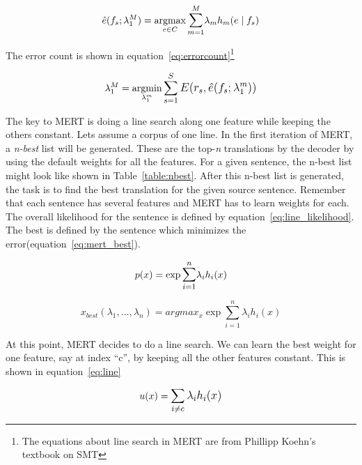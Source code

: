 \begin{equation} \label{eq:maximization_mert}
	\hat{e}(f_{s};\lambda_{1}^M) = \argmax_{e \in C} \mathlarger\sum\limits_{m=1}^{M} \lambda_{m}h_{m}(e \mid f_{s})
\end{equation}



The error count is shown in equation~\eqref{eq:errorcount}\footnote{The equations about line search in MERT are from Phillipp Koehn's textbook on SMT}

\begin{equation} \label{eq:errorcount}
	\lambda_{1}^{M} = \argmin_{\lambda_{1}^{m}} \mathlarger{\sum\limits_{s=1}^{S}E(r_{s}, \hat{e}(f_{s};\lambda_{1}^{m}))}
\end{equation}

The key to MERT is doing a line search along one feature while keeping the others constant. Lets assume a corpus of one line. In the first iteration of MERT, a \emph{n-best} list will be generated. These are the top-\emph{n} translations by the decoder by using the default weights for all the features. For a given sentence, the n-best list might look like shown in Table~\ref{table:nbest}. After this n-best list is generated, the task is to find the best translation for the given source sentence. Remember that each sentence has several features and MERT has to learn weights for each. The overall likelihood for the sentence is defined by equation~\eqref{eq:line_likelihood}. The best is defined by the sentence which minimizes the error(equation~\eqref{eq:mert_best}). 

\begin{equation} \label{eq:line_likelihood}
	p(x) = \exp\mathlarger{\sum_{i=1}^n}\lambda_{i}h_{i}(x)
\end{equation}

\begin{equation} \label{eq:mert_best}
	x_{best}(\lambda_{1}, ..., \lambda_{n}) = argmax_{x}\exp\sum_{i=1}^n \lambda_{i}h_{i}(x)
\end{equation}

At this point, MERT decides to do a line search. We can learn the best weight for one feature, say at index ``c'', by keeping all the other features constant. This is shown in equation~\eqref{eq:line}


\begin{equation} \label{eq:line}
	u(x) = \mathlarger{\sum_{i \neq c}\lambda_{i}h_{i}(x)}
\end{equation}

